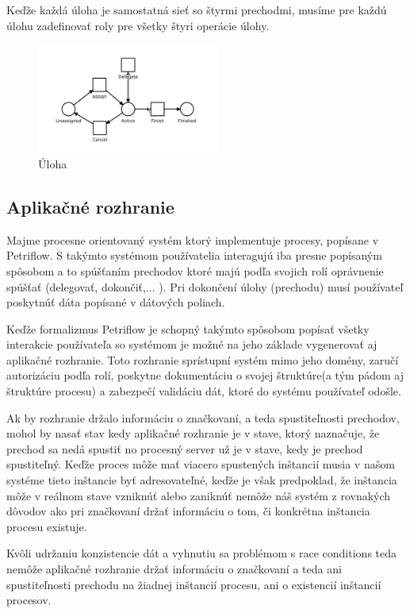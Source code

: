 Keďže každá úloha je samostatná sieť so štyrmi prechodmi, musíme pre každú úlohu zadefinovať roly pre všetky štyri operácie úlohy.

\begin{figure}[!htbp]
\centering
\includegraphics[width=6cm]{img/task_transition.png}
\caption{Úloha}
\label{task}
\end{figure}

\subsection{Aplikačné rozhranie}

Majme procesne orientovaný systém ktorý implementuje procesy, popísane v Petriflow. S takýmto systémom používatelia interagujú iba presne popísaným spôsobom a to spúšťaním prechodov ktoré majú podľa svojich rolí oprávnenie spúšťať (delegovať, dokončiť,... ). Pri dokončení úlohy (prechodu) musí používateľ poskytnúť dáta popísané v dátových poliach.

Keďže formalizmus Petriflow je schopný takýmto spôsobom popísať všetky interakcie používateľa so systémom je možné na jeho základe vygenerovať aj aplikačné rozhranie. Toto rozhranie sprístupní systém mimo jeho domény, zaručí autorizáciu podľa rolí, poskytne dokumentáciu o svojej štruktúre(a tým pádom aj štruktúre procesu) a zabezpečí validáciu dát, ktoré do systému používateľ odošle.

Ak by rozhranie držalo informáciu o značkovaní, a teda spustiteľnosti prechodov, mohol by nasať stav kedy aplikačné rozhranie je v stave, ktorý naznačuje, že prechod sa nedá spustiť no procesný server už je v stave, kedy je prechod spustiteľný. Keďže proces môže mať viacero spustených inštancií musia v našom systéme tieto inštancie byť adresovateľné, keďže je však predpoklad, že inštancia môže v reálnom stave vzniknúť alebo zaniknúť nemôže náš systém z rovnakých dôvodov ako pri značkovaní držať informáciu o tom, či konkrétna inštancia procesu existuje. 

Kvôli udržaniu konzistencie dát a vyhnutiu sa problémom s race conditions teda nemôže aplikačné rozhranie držať informáciu o značkovaní a teda ani spustiteľnosti prechodu na žiadnej inštancií procesu, ani o existencií inštancií procesov.


